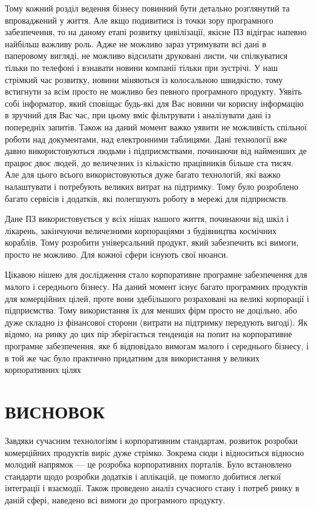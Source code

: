 Тому кожний розділ ведення бізнесу повинний бути детально розглянутий та впроваджений у життя. 
Але якщо подивитися із точки зору програмного забезпечення, то на даному етапі розвитку цивілізації, якісне ПЗ відіграє напевно найбільш важливу роль. 
Адже не можливо зараз утримувати всі дані в паперовому вигляді, не можливо відсилати друковані листи, чи спілкуватися тільки по телефоні і взнавати новини компанії тільки при зустрічі. 
У наш стрімкий час розвитку, новини міняються із колосальною швидкістю, тому встигнути за всім просто не можливо без певного програмного продукту. 
Уявіть собі інформатор, який сповіщає будь-які для Вас новини чи корисну інформацію в зручний для Вас час, при цьому вміє фільтрувати і аналізувати дані із попередніх запитів. 
Також на даний момент важко уявити не можливість спільної роботи над документами, над електронними таблицями. 
Дані технології вже давно використовуються людьми і підприємствами, починаючи від найменших де працює двоє людей, до величезних із кількістю працівників більше ста тисяч. 
Але для цього всього використовуються дуже багато технологій, які важко налаштувати і потребують великих витрат на підтримку.
Тому було розроблено багато сервісів і додатків, які полегшують роботу в мережі для підприємств.
\par Дане ПЗ використовується у всіх нішах нашого життя, починаючи від шкіл і лікарень, закінчуючи величезними корпораціями з будівництва космічних кораблів. 
Тому розробити універсальний продукт, який забезпечить всі вимоги, просто не можливо. 
Для кожної сфери існують свої нюанси.
\par Цікавою нішею для дослідження стало корпоративне програмне забезпечення для малого і середнього бізнесу.
 На даний момент існує багато програмних продуктів для комерційних цілей, проте вони здебільшого розраховані на великі корпорації і підприємства.
Тому використання їх для менших фірм просто не доцільно, або дуже складно із фінансової сторони (витрати на підтримку передують вигоді).
Як відомо, на ринку до цих пір зберігається тенденція на попит на корпоративне програмне забезпечення, яке б відповідало вимогам малого і середнього бізнесу, і в той же час було практично придатним для використання у великих корпоративних цілях








\section*{ВИСНОВОК}
Завдяки сучасним технологіям і корпоративним стандартам, розвиток розробки комерційних продуктів виріс дуже стрімко. 
Зокрема сюди і відноситься відносно молодий напрямок --- це розробка корпоративних порталів. 
Було встановлено стандарти щодо розробки додатків і аплікацій, це помогло добитися легкої інтеграції і взаємодії. 
Також проведено аналіз сучасного стану і потреб ринку в даній сфері, наведено всі вимоги до програмного продукту.



